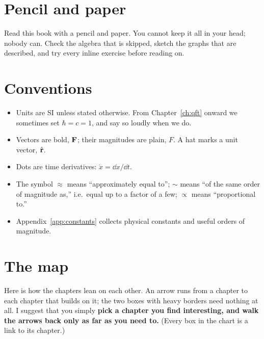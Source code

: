 \section*{Pencil and paper}

Read this book with a pencil and paper. You cannot keep it all in your head; nobody can. Check the algebra that is skipped, sketch the graphs that are described, and try every inline exercise before reading on.

\section*{Conventions}

\begin{itemize}[itemsep=3pt]
  \item Units are SI unless stated otherwise. From Chapter~\ref{ch:qft} onward we sometimes set $\hbar = c = 1$, and say so loudly when we do.
  \item Vectors are bold, $\mathbf{F}$; their magnitudes are plain, $F$. A hat marks a unit vector, $\hat{\mathbf{r}}$.
  \item Dots are time derivatives: $\dot x = \dd x/\dd t$.
  \item The symbol $\approx$ means ``approximately equal to''; $\sim$ means ``of the same order of magnitude as,'' i.e.\ equal up to a factor of a few; $\propto$ means ``proportional to.''
  \item Appendix~\ref{app:constants} collects physical constants and useful orders of magnitude.
\end{itemize}

\clearpage
\section*{The map}

Here is how the chapters lean on each other. An arrow runs from a chapter to each chapter that builds on it; the two boxes with heavy borders need nothing at all. I suggest that you simply \textbf{pick a chapter you find interesting, and walk the arrows back only as far as you need to.} (Every box in the chart is a link to its chapter.)

\begin{center}

\end{center}
